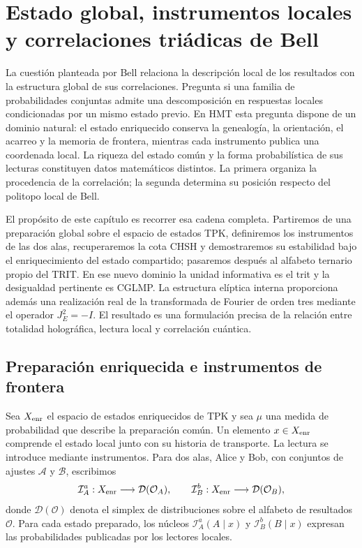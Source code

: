 \section{Estado global, instrumentos locales y correlaciones triádicas de Bell}
\label{chap:bell-local-global}

La cuestión planteada por Bell \cite{Bell1964} relaciona la descripción local de los
resultados con la estructura global de sus correlaciones. Pregunta si una familia de
probabilidades conjuntas admite una descomposición en respuestas locales
condicionadas por un mismo estado previo. En HMT esta pregunta dispone de un dominio natural: el estado enriquecido conserva la
genealogía, la orientación, el acarreo y la memoria de frontera, mientras cada
instrumento publica una coordenada local. La riqueza del estado común y la forma
probabilística de sus lecturas constituyen datos matemáticos distintos. La primera
organiza la procedencia de la correlación; la segunda determina su posición respecto
del politopo local de Bell.

El propósito de este capítulo es recorrer esa cadena completa. Partiremos de una
preparación global sobre el espacio de estados TPK, definiremos los instrumentos de
las dos alas, recuperaremos la cota CHSH y demostraremos su estabilidad bajo el
enriquecimiento del estado compartido; pasaremos después al alfabeto ternario propio
del TRIT. En ese nuevo
dominio la unidad informativa es el trit y la desigualdad pertinente es CGLMP. La
estructura elíptica interna proporciona además una realización real de la transformada
de Fourier de orden tres mediante el operador \(J_E^2=-I\). El resultado es
una formulación precisa de la relación entre totalidad holográfica, lectura local y
correlación cuántica.

\subsection{Preparación enriquecida e instrumentos de frontera}

Sea \(X_{\rm enr}\) el espacio de estados enriquecidos de TPK y sea
\(\mu\) una medida de probabilidad que describe la preparación común. Un elemento
\(x\in X_{\rm enr}\) comprende el estado local junto con su historia de transporte.
La lectura se introduce mediante instrumentos. Para dos
alas, Alice y Bob, con conjuntos de ajustes \(\mathcal A\) y \(\mathcal B\),
escribimos
\[
 \mathcal I_A^a:X_{\rm enr}\longrightarrow\mathcal D(\mathcal O_A),
 \qquad
 \mathcal I_B^b:X_{\rm enr}\longrightarrow\mathcal D(\mathcal O_B),
\]
donde \(\mathcal D(\mathcal O)\) denota el simplex de distribuciones sobre el
alfabeto de resultados \(\mathcal O\). Para cada estado preparado, los núcleos
\(\mathcal I_A^a(A\mid x)\) y \(\mathcal I_B^b(B\mid x)\) expresan las
probabilidades publicadas por los lectores locales.

